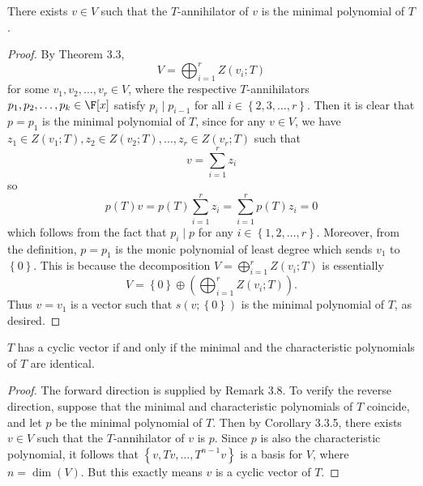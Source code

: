 \documentclass[linearalgebraII]{subfiles}
\begin{document}
    \begin{cor}{}
        There exists $v\in V$ such that the $T$-annihilator of $v$ is the minimal polynomial of $T$.
    \end{cor}	

    \begin{proof}
        By Theorem 3.3,
        \begin{equation*}
            V = \bigoplus^{r}_{i=1} Z\left( v_i;T \right) 
        \end{equation*}
        for some $v_1,v_2,\ldots,v_r\in V$, where the respective $T$-annihilators $p_1,p_2,\ldots,p_k\in\F[x]$ satisfy $p_i\mid p_{i-1}$ for all $i\in \left\lbrace 2,3,\ldots,r \right\rbrace$. Then it is clear that $p=p_1$ is the minimal polynomial of $T$, since for any $v\in V$, we have $z_1\in Z(v_1;T), z_2\in Z(v_2;T), \ldots, z_r\in Z\left( v_r;T \right)$ such that
        \begin{equation*}
            v = \sum^{r}_{i=1} z_i
        \end{equation*}
        so
        \begin{equation*}
            p(T)v = p(T)\sum^{r}_{i=1} z_i = \sum^{r}_{i=1} p(T)z_i = 0
        \end{equation*}
        which follows from the fact that $p_i\mid p$ for any $i\in \left\lbrace 1,2,\ldots,r \right\rbrace$. Moreover, from the definition, $p=p_1$ is the monic polynomial of least degree which sends $v_1$ to $\left\lbrace 0 \right\rbrace$. This is because the decomposition $V=\bigoplus^{r}_{i=1} Z\left( v_i;T \right)$ is essentially
        \begin{equation*}
            V = \left\lbrace 0 \right\rbrace \oplus \left( \bigoplus^{r}_{i=1} Z\left( v_i;T \right)  \right) .
        \end{equation*}
        Thus $v=v_1$ is a vector such that $s\left( v;\left\lbrace 0 \right\rbrace  \right) $ is the minimal polynomial of $T$, as desired.
    \end{proof}

    \begin{cor}{}
        $T$ has a cyclic vector if and only if the minimal and the characteristic polynomials of $T$ are identical.
    \end{cor}	

    \begin{proof}
        The forward direction is supplied by Remark 3.8. To verify the reverse direction, suppose that the minimal and characteristic polynomials of $T$ coincide, and let $p$ be the minimal polynomial of $T$. Then by Corollary 3.3.5, there exists $v\in V$ such that the $T$-annihilator of $v$ is $p$. Since $p$ is also the characteristic polynomial, it follows that $\left\lbrace v,Tv, \ldots, T^{n-1}v \right\rbrace$ is a basis for $V$, where $n=\dim(V)$. But this exactly means $v$ is a cyclic vector of $T$.
    \end{proof}
\end{document}
